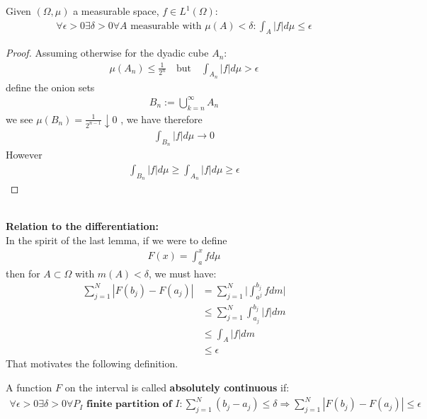 \begin{lemma}
	Given $(\Omega, \mu)$ a measurable space, $f \in L^1(\Omega)$:
	\begin{align*}
		\forall \epsilon > 0 \exists \delta > 0 \forall A \text{ measurable with } \mu(A) < \delta : \int_A |f|d\mu \le \epsilon
	\end{align*}
\end{lemma}
\begin{proof}
	Assuming otherwise for the dyadic cube $A_n$:
	\begin{align*}
		\mu(A_n) \le \frac{1}{2^n} \quad
		\text{but} 
		\quad
		\int_{A_n}|f| d\mu > \epsilon
	\end{align*}
	define the onion sets
	\begin{align*}
		B_n := \bigcup_{k = n}^\infty A_n
	\end{align*}
	we see $\mu(B_n) = \frac{1}{2^{n-1}} \downarrow 0$ , we have therefore
	\begin{align*}
		\int_{B_n} |f| d\mu \rightarrow 0
	\end{align*}
	However
	\begin{align*}
		\int_{B_n} |f|d\mu \geq \int_{A_n}|f|d\mu \ge \epsilon 
	\end{align*}
\end{proof}

\quad\\
\textbf{Relation to the differentiation:}\\
In the spirit of the last lemma, if we were to define
\begin{align*}
	F(x) = \int_a^x f d\mu
\end{align*}
then for $A \subset \Omega$ with $m(A) < \delta$, we must have:
\begin{align*}
	\sum_{j = 1}^N |F(b_j) - F(a_j)| &= \sum_{j = 1}^N \bigg|\int_{a^j}^{b_j}fdm\bigg|\\
	&\le \sum_{j = 1}^N\int_{a_j}^{b_j}|f|dm\\
	&\le \int_A|f|dm \\
	&\le \epsilon
\end{align*}
That motivates the following definition. 

\begin{definition}
	A function $F$ on the interval is called \textbf{absolutely continuous} if:
	\begin{align*}
		\forall \epsilon > 0 \exists \delta > 0 \forall P_I  \textbf{  finite partition of $I$}: \sum_{j = 1}^N (b_j - a_j) \leq \delta \Rightarrow \sum_{j = 1}^N |F(b_j) - F(a_j)| \leq \epsilon
	\end{align*}
\end{definition}

